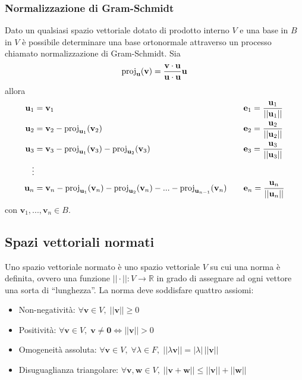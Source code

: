     \subsubsection{Normalizzazione di Gram-Schmidt}
    Dato un qualsiasi spazio vettoriale dotato di prodotto interno $V$ e una base in $B$ in $V$ è possibile determinare una base ortonormale
    attraverso un processo chiamato normalizzazione di Gram-Schmidt. Sia
    \[
        \textnormal{proj}_{\mathbf{u}}(\mathbf{v}) = \frac{\mathbf{v} \cdot \mathbf{u}}{\mathbf{u} \cdot \mathbf{u}} \mathbf{u}
    \]
    allora
    \[
        \begin{aligned}
            \mathbf{u}_{1} &= \mathbf{v}_{1} &\quad& \mathbf{e}_{1} = \frac{\mathbf{u}_{1}}{||\mathbf{u}_{1}||} \\
            \mathbf{u}_{2} &= \mathbf{v}_{2} - \textnormal{proj}_{\mathbf{u}_{1}}(\mathbf{v}_{2}) &\quad& \mathbf{e}_{2} = \frac{\mathbf{u}_{2}}{||\mathbf{u}_{2}||} \\
            \mathbf{u}_{3} &= \mathbf{v}_{3} - \textnormal{proj}_{\mathbf{u}_{1}}(\mathbf{v}_3) - \textnormal{proj}_{\mathbf{u}_{2}}(\mathbf{v}_3) &\quad& \mathbf{e}_{3} = \frac{\mathbf{u}_{3}}{||\mathbf{u}_{3}||} \\
            \vdots \\
            \mathbf{u}_{n} &= \mathbf{v}_{n} - \textnormal{proj}_{\mathbf{u}_{1}}(\mathbf{v}_{n}) - \textnormal{proj}_{\mathbf{u}_{2}}(\mathbf{v}_{n}) - ... - \textnormal{proj}_{\mathbf{u}_{n - 1}}(\mathbf{v}_{n}) &\quad& \mathbf{e}_{n} = \frac{\mathbf{u}_{n}}{||\mathbf{u}_{n}||} \\
        \end{aligned}
    \]
    con $\mathbf{v}_{1}, ..., \mathbf{v}_{n} \in B$.




\vspace{10pt}
\subsection{Spazi vettoriali normati} \label{subsec:vsnormed}
    Uno spazio vettoriale normato è uno spazio vettoriale $V$ su cui una norma è definita, ovvero una funzione $||\cdot||: V \rightarrow \mathbb{R}$ in grado di assegnare
    ad ogni vettore una sorta di ``lunghezza''. La norma deve soddisfare quattro assiomi:
    \begin{itemize}
        \item Non-negatività: $\forall \mathbf{v} \in V, \; ||\mathbf{v}|| \geq 0$
        \item Positività: $\forall \mathbf{v} \in V, \; \mathbf{v} \neq \mathbf{0} \iff ||\mathbf{v}|| > 0$
        \item Omogeneità assoluta: $\forall \mathbf{v} \in V, \; \forall \lambda \in F, \; ||\lambda\mathbf{v}|| = |\lambda|\,||\mathbf{v}||$
        \item Disuguaglianza triangolare: $\forall \mathbf{v}, \mathbf{w} \in V, \; ||\mathbf{v} + \mathbf{w}|| \leq ||\mathbf{v}|| + ||\mathbf{w}||$
    \end{itemize}

